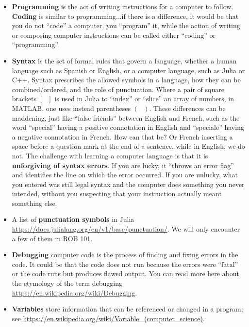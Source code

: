 \begin{itemize}
    \item \textbf{Programming} is the act of writing instructions for a computer to follow. \textbf{Coding} is similar to programming...if there is a difference, it would be that you do not ``code'' a computer, you ``program'' it, while the action of writing or composing computer instructions can be called either ``coding'' or ``programming''. 
    \item \textbf{Syntax} is the set of formal rules that govern a language, whether a human language such as Spanish or English, or a computer language, such as Julia or C++. Syntax prescribes the allowed symbols in a language, how they can be combined/ordered, and the role of punctuation. Where a pair of square brackets $[~~~ ]$ is used in Julia to ``index'' or ``slice'' an array of numbers, in MATLAB, one uses instead parentheses $( ~~~ )$. These differences can be maddening, just like ``false friends'' between English and French, such as the word ``special'' having a positive connotation in English and ``speciale'' having a negative connotation in French. How can that be? Or French inserting a space before a question mark at the end of a sentence, while in English, we do not. The challenge with learning a computer language is that it is \textbf{unforgiving of syntax errors}. If you are lucky, it ``throws an error flag'' and identifies the line on which the error occurred. If you are unlucky, what you entered was still legal syntax and the computer does something you never intended, without you suspecting that your instruction actually meant something else. 
    \item A list of \textbf{punctuation symbols} in Julia \url{https://docs.julialang.org/en/v1/base/punctuation/}. We will only encounter a few of them in ROB 101.
    \item \textbf{Debugging} computer code is the process of finding and fixing errors in the code. It could be that the code does not run because the errors were ``fatal'' or the code runs but produces flawed output. You can read more here about the etymology of the term debugging \url{https://en.wikipedia.org/wiki/Debugging}. 
    \item \textbf{Variables} store information that can be referenced or changed in a program; see \url{https://en.wikipedia.org/wiki/Variable_(computer_science)}.

\end{itemize}
